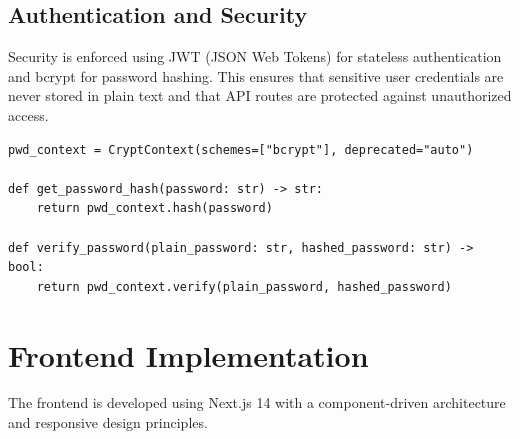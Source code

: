 \subsection{Authentication and Security}

Security is enforced using JWT (JSON Web Tokens) for stateless authentication and bcrypt for password hashing. This ensures that sensitive user credentials are never stored in plain text and that API routes are protected against unauthorized access.

\begin{lstlisting}[style=pythonstyle, caption={Password Hashing and Verification}, basicstyle=\ttfamily\footnotesize]
pwd_context = CryptContext(schemes=["bcrypt"], deprecated="auto")

def get_password_hash(password: str) -> str:
    return pwd_context.hash(password)

def verify_password(plain_password: str, hashed_password: str) -> bool:
    return pwd_context.verify(plain_password, hashed_password)
\end{lstlisting}

\section{Frontend Implementation}

The frontend is developed using Next.js 14 with a component-driven architecture and responsive design principles.

